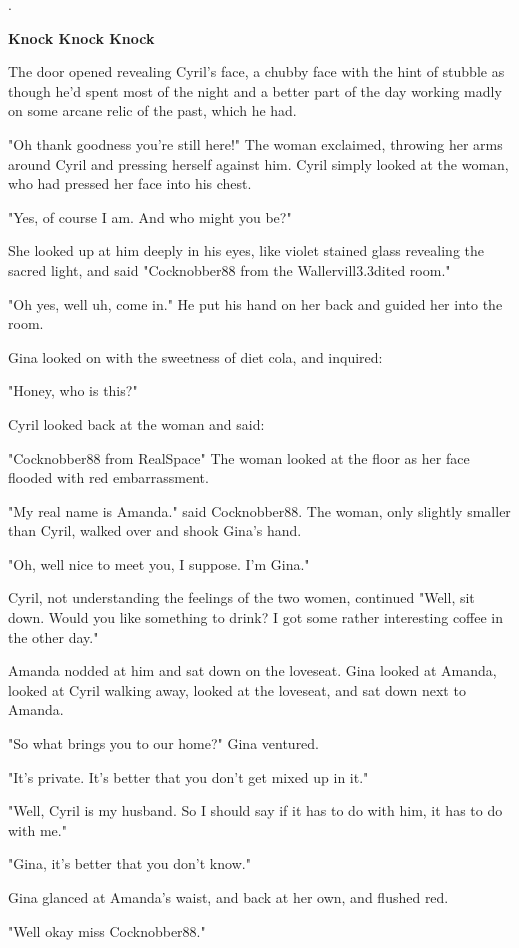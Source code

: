 \documentclass[12pt]{article}
\begin{document}
.

\textbf{Knock Knock Knock}

The door opened revealing Cyril's face, a chubby face with the hint of stubble as though he'd spent most of the night and a better part of the day working madly on some arcane relic of the past, which he had. 

"Oh thank goodness you're still here!" The woman exclaimed, throwing her arms around Cyril and pressing herself against him. Cyril simply looked at the woman, who had pressed her face into his chest.

"Yes, of course I am. And who might you be?"

She looked up at him deeply in his eyes, like violet stained glass revealing the sacred light, and said "Cocknobber88 from the Wallervill3.3dited room."

"Oh yes, well uh, come in." He put his hand on her back and guided her into the room.

Gina looked on with the sweetness of diet cola, and inquired:

"Honey, who is this?"

Cyril looked back at the woman and said:

"Cocknobber88 from RealSpace" The woman looked at the floor as her face flooded with red embarrassment.

"My real name is Amanda." said Cocknobber88. The woman, only slightly smaller than Cyril, walked over and shook Gina's hand.

"Oh, well nice to meet you, I suppose. I'm Gina."

Cyril, not understanding the feelings of the two women, continued "Well, sit down. Would you like something to drink? I got some rather interesting coffee in the other day." 

Amanda nodded at him and sat down on the loveseat. Gina looked at Amanda, looked at Cyril walking away, looked at the loveseat, and sat down next to Amanda.

"So what brings you to our home?" Gina ventured.

"It's private. It's better that you don't get mixed up in it."

"Well, Cyril is my husband. So I should say if it has to do with him, it has to do with me."

"Gina, it's better that you don't know."

Gina glanced at Amanda's waist, and back at her own, and flushed red.

"Well okay miss Cocknobber88."
\end{document}
